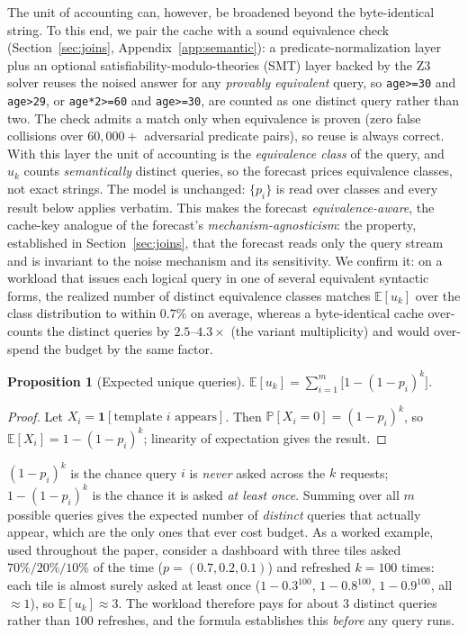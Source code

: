 \documentclass[sigconf,nonacm]{acmart}
\newcommand{\E}{\mathbb{E}}
\newcommand{\Prob}{\mathbb{P}}
\newtheorem{prop}{Proposition}
\begin{document}
The unit of accounting can, however, be broadened beyond the byte-identical string. To this end, we pair the cache with a sound equivalence check (Section~\ref{sec:joins}, Appendix~\ref{app:semantic}): a predicate-normalization layer plus an optional satisfiability-modulo-theories (SMT) layer backed by the Z3 solver reuses the noised answer for any \emph{provably equivalent} query, so \texttt{age>=30} and \texttt{age>29}, or \texttt{age*2>=60} and \texttt{age>=30}, are counted as one distinct query rather than two. The check admits a match only when equivalence is proven (zero false collisions over $60{,}000{+}$ adversarial predicate pairs), so reuse is always correct. With this layer the unit of accounting is the \emph{equivalence class} of the query, and $u_k$ counts \emph{semantically} distinct queries, so the forecast prices equivalence classes, not exact strings. The model is unchanged: $\{p_i\}$ is read over classes and every result below applies verbatim. This makes the forecast \emph{equivalence-aware}, the cache-key analogue of the forecast's \emph{mechanism-agnosticism}: the property, established in Section~\ref{sec:joins}, that the forecast reads only the query stream and is invariant to the noise mechanism and its sensitivity. We confirm it: on a workload that issues each logical query in one of several equivalent syntactic forms, the realized number of distinct equivalence classes matches $\E[u_k]$ over the class distribution to within $0.7\%$ on average, whereas a byte-identical cache over-counts the distinct queries by $2.5$--$4.3\times$ (the variant multiplicity) and would over-spend the budget by the same factor.

\begin{prop}[Expected unique queries]
\label{prop:eu}
$\E[u_k]=\sum_{i=1}^m\bigl[1-(1-p_i)^k\bigr]$.
\end{prop}
\begin{proof}
Let $X_i=\mathbf 1[\text{template }i\text{ appears}]$. Then $\Prob[X_i=0]=(1-p_i)^k$, so $\E[X_i]=1-(1-p_i)^k$; linearity of expectation gives the result.
\end{proof}

\noindent $(1-p_i)^k$ is the chance query $i$ is \emph{never} asked across the $k$ requests; $1-(1-p_i)^k$ is the chance it is asked \emph{at least once}. Summing over all $m$ possible queries gives the expected number of \emph{distinct} queries that actually appear, which are the only ones that ever cost budget. As a worked example, used throughout the paper, consider a dashboard with three tiles asked $70\%/20\%/10\%$ of the time ($p{=}(0.7,0.2,0.1)$) and refreshed $k{=}100$ times: each tile is almost surely asked at least once ($1-0.3^{100}$, $1-0.8^{100}$, $1-0.9^{100}$, all $\approx1$), so $\E[u_k]\approx3$. The workload therefore pays for about $3$ distinct queries rather than $100$ refreshes, and the formula establishes this \emph{before} any query runs.
\end{document}
